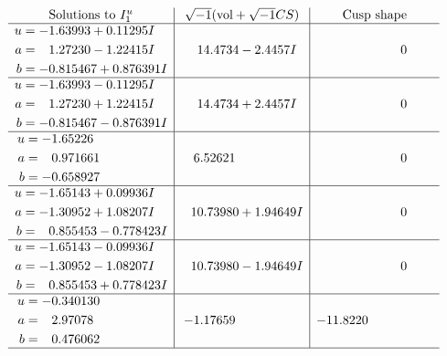 \documentclass[1p]{elsarticle_modified}
\theoremstyle{definition}
\newcommand{\I}{\sqrt{-1}}
\begin{document}
$$\begin{array}{c|c|c}
\text{Solutions to }I^u_{1}& \I (\text{vol} + \sqrt{-1}CS) & \text{Cusp shape}\\
 \hline 
\begin{aligned}
u &= -1.63993 + 0.11295 I \\
a &= \phantom{-}1.27230 - 1.22415 I \\
b &= -0.815467 + 0.876391 I\end{aligned}
 & \phantom{-}14.4734 - 2.4457 I & \phantom{-0.000000 } 0 \\ \hline\begin{aligned}
u &= -1.63993 - 0.11295 I \\
a &= \phantom{-}1.27230 + 1.22415 I \\
b &= -0.815467 - 0.876391 I\end{aligned}
 & \phantom{-}14.4734 + 2.4457 I & \phantom{-0.000000 } 0 \\ \hline\begin{aligned}
u &= -1.65226\phantom{ +0.000000I} \\
a &= \phantom{-}0.971661\phantom{ +0.000000I} \\
b &= -0.658927\phantom{ +0.000000I}\end{aligned}
 & \phantom{-}6.52621\phantom{ +0.000000I} & \phantom{-0.000000 } 0 \\ \hline\begin{aligned}
u &= -1.65143 + 0.09936 I \\
a &= -1.30952 + 1.08207 I \\
b &= \phantom{-}0.855453 - 0.778423 I\end{aligned}
 & \phantom{-}10.73980 + 1.94649 I & \phantom{-0.000000 } 0 \\ \hline\begin{aligned}
u &= -1.65143 - 0.09936 I \\
a &= -1.30952 - 1.08207 I \\
b &= \phantom{-}0.855453 + 0.778423 I\end{aligned}
 & \phantom{-}10.73980 - 1.94649 I & \phantom{-0.000000 } 0 \\ \hline\begin{aligned}
u &= -0.340130\phantom{ +0.000000I} \\
a &= \phantom{-}2.97078\phantom{ +0.000000I} \\
b &= \phantom{-}0.476062\phantom{ +0.000000I}\end{aligned}
 & -1.17659\phantom{ +0.000000I} & -11.8220\phantom{ +0.000000I}\\
 \hline 
 \end{array}$$\newpage\newpage\renewcommand{\arraystretch}{1}
\end{document}

